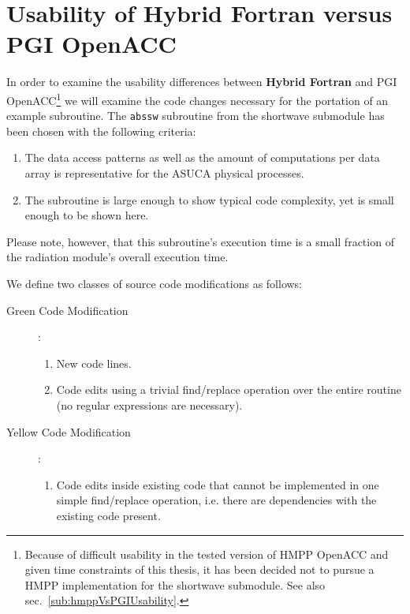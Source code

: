\clearpage
\section{Usability of Hybrid Fortran versus PGI OpenACC} \label{sec:usabilityValidation}

In order to examine the usability differences between \textbf{Hybrid Fortran} and PGI OpenACC\footnote{Because of difficult usability in the tested version of HMPP OpenACC and given time constraints of this thesis, it has been decided not to pursue a HMPP implementation for the shortwave submodule. See also sec.~\ref{sub:hmppVsPGIUsability}.} we will examine the code changes necessary for the portation of an example subroutine. The \verb|abssw| subroutine from the shortwave submodule has been chosen with the following criteria: 

\begin{enumerate}
 \item The data access patterns as well as the amount of computations per data array is representative for the ASUCA physical processes.
 \item The subroutine is large enough to show typical code complexity, yet is small enough to be shown here. 
\end{enumerate}

Please note, however, that this subroutine's execution time is a small fraction of the radiation module's overall execution time. 

We define two classes of source code modifications as follows:

\begin{description}
 \item [Green Code Modification]: \begin{enumerate}
    \item New code lines.
    \item Code edits using a trivial find/replace operation over the entire routine (no regular expressions are necessary).
  \end{enumerate}
 \item [Yellow Code Modification]: \begin{enumerate}
    \item Code edits inside existing code that cannot be implemented in one simple find/replace operation, i.e. there are dependencies with the existing code present.
  \end{enumerate}
\end{description}

